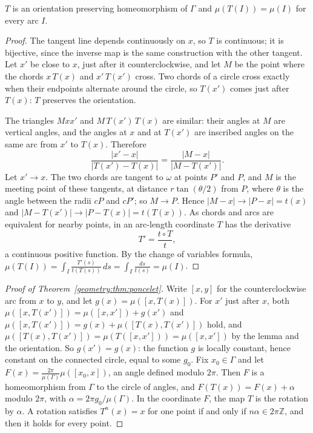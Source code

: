 \begin{lemma}\label{geometry:lem:poncelet}
$T$ is an orientation preserving homeomorphism of $\Gamma$ and $\mu(T(I))=\mu(I)$ for every arc $I$.
\end{lemma}

\begin{proof}
The tangent line depends continuously on $x$, so $T$ is continuous; it is bijective, since the inverse map is the same construction with the other
tangent. Let $x'$ be close to $x$, just after it counterclockwise, and let $M$ be the point where the chords $x\,T(x)$ and $x'\,T(x')$ cross. Two chords of
a circle cross exactly when their endpoints alternate around the circle, so $T(x')$ comes just after $T(x)$: $T$ preserves the orientation.

The triangles $Mxx'$ and $M\,T(x')\,T(x)$ are similar: their angles at $M$ are vertical angles, and the angles at $x$ and at $T(x')$ are inscribed
angles on the same arc from $x'$ to $T(x)$. Therefore
\[
\frac{|x'-x|}{|T(x')-T(x)|}=\frac{|M-x|}{|M-T(x')|}.
\]
Let $x'\to x$. The two chords are tangent to $\omega$ at points $P'$ and $P$, and $M$ is the meeting point of these tangents, at distance
$r\tan(\theta/2)$ from $P$, where $\theta$ is the angle between the radii $cP$ and $cP'$; so $M\to P$. Hence $|M-x|\to|P-x|=t(x)$ and
$|M-T(x')|\to|P-T(x)|=t(T(x))$. As chords and arcs are equivalent for nearby points, in an arc-length coordinate $T$ has the derivative
\[
T'=\frac{t\circ T}{t},
\]
a continuous positive function. By the change of variables formula,
$\mu(T(I))=\int_I\frac{T'(s)}{t(T(s))}\,ds=\int_I\frac{ds}{t(s)}=\mu(I)$.
\end{proof}

\begin{proof}[Proof of Theorem~\ref{geometry:thm:poncelet}]
Write $[x,y]$ for the counterclockwise arc from $x$ to $y$, and let $g(x)=\mu([x,T(x)])$. For $x'$ just after $x$, both $\mu([x,T(x')])=\mu([x,x'])+g(x')$
and $\mu([x,T(x')])=g(x)+\mu([T(x),T(x')])$ hold, and $\mu([T(x),T(x')])=\mu(T([x,x']))=\mu([x,x'])$ by the lemma and the orientation. So $g(x')=g(x)$:
the function $g$ is locally constant, hence constant on the connected circle, equal to some $g_0$. Fix $x_0\in\Gamma$ and let
$F(x)=\frac{2\pi}{\mu(\Gamma)}\mu([x_0,x])$, an angle defined modulo $2\pi$. Then $F$ is a homeomorphism from $\Gamma$ to the circle of angles, and
$F(T(x))=F(x)+\alpha$ modulo $2\pi$, with $\alpha=2\pi g_0/\mu(\Gamma)$. In the coordinate $F$, the map $T$ is the rotation by $\alpha$. A rotation
satisfies $T^n(x)=x$ for one point if and only if $n\alpha\in2\pi\mathbb Z$, and then it holds for every point.
\end{proof}

